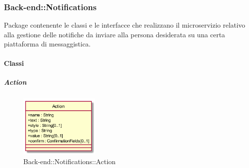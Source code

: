 \subsubsection{Back-end::Notifications}
Package contenente le classi e le interfacce che realizzano il microservizio relativo alla gestione delle notifiche da inviare alla persona desiderata su una certa piattaforma di messaggistica.\\



\paragraph{Classi}
\hypertarget{Action_label}{\subparagraph{Action}}
\begin{figure}[h]
	\centering
	\includegraphics[width=0.35\textwidth,height=\textheight,keepaspectratio]{images/ClassAction.png}
	\caption{Back-end::Notifications::Action}
\end{figure}

